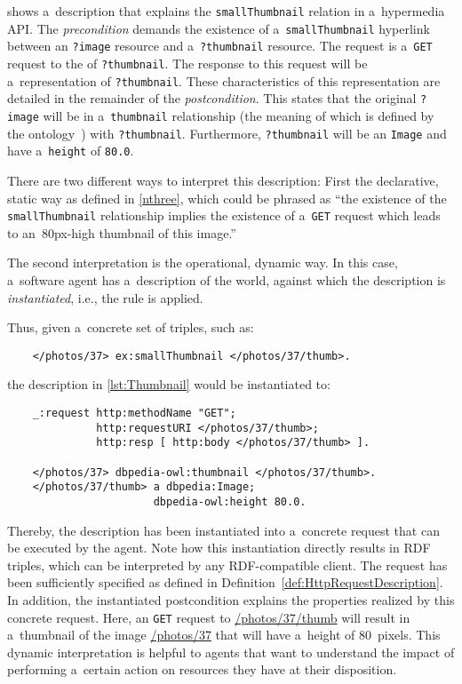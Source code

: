  shows a~description
that explains the \verb!smallThumbnail! relation in a~hypermedia API.
The \emph{precondition} demands the existence of
a~\verb!smallThumbnail! hyperlink
between an \verb!?image! resource
and a~\verb!?thumbnail! resource.
The \http request
is a~\verb!GET! request to the \URL of \verb!?thumbnail!.
The response to this request will be a~representation of \verb!?thumbnail!.
These characteristics of this representation are detailed in the remainder of the \emph{postcondition}.
This states that the original \verb!?image!
will be in a~\verb!thumbnail! relationship
(the meaning of which is defined by the \dbpedia ontology~\cite{DBpedia})
with \verb!?thumbnail!.
Furthermore, \verb!?thumbnail! will be an \verb!Image!
and have a~\verb!height! of \verb!80.0!.

There are two different ways to interpret this description:
First the declarative, static way as defined in \cref{nthree},
which could be phrased as
\enquote{the existence of the \texttt{smallThumbnail} relationship
implies the existence of a~\texttt{GET} request
which leads to an~80px-high thumbnail of this image.}

The second interpretation is the operational, dynamic way.
In this case, a~software agent has a~description of the world,
against which the description is \emph{instantiated},
i.e., the rule is applied.

Thus, given a~concrete set of triples, such as:
\begin{Verbatim}
    </photos/37> ex:smallThumbnail </photos/37/thumb>.
\end{Verbatim}
the description in \cref{lst:Thumbnail} would be instantiated to: 
\begin{Verbatim}
    _:request http:methodName "GET";
              http:requestURI </photos/37/thumb>;
              http:resp [ http:body </photos/37/thumb> ].

    </photos/37> dbpedia-owl:thumbnail </photos/37/thumb>.
    </photos/37/thumb> a dbpedia:Image;
                       dbpedia-owl:height 80.0.
\end{Verbatim}
Thereby, the description has been instantiated into a~concrete \http request
that can be executed by the agent.
Note how this instantiation directly results in RDF triples,
which can be interpreted by any RDF-compatible client.
The request has been sufficiently specified
as defined in Definition~\ref{def:HttpRequestDescription}.
In addition, the instantiated postcondition
explains the properties realized by this concrete request.
Here, an \http \verb!GET! request to \url{/photos/37/thumb}
will result in a~thumbnail of the image \url{/photos/37}
that will have a~height of 80~pixels.
This dynamic interpretation is helpful to agents
that want to understand the impact
of performing a~certain action on resources they have at their disposition.

